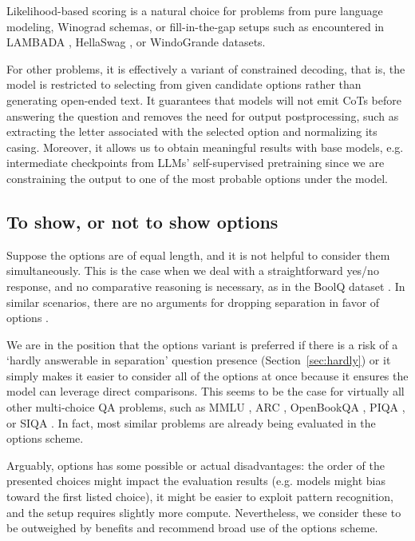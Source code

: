 \documentclass[11pt]{article}
\DeclareRobustCommand{\shl}[3]{
  \begingroup\setlength{\fboxsep}{2pt}%
  \colorbox{#1}{{\hspace*{2pt}\vphantom{Ay}#2\hspace*{2pt}}}%
  \endgroup
}
\begin{document}
Likelihood-based scoring is a natural choice for problems from pure language modeling, Winograd schemas, or fill-in-the-gap setups such as encountered in LAMBADA \cite{paperno2016lambadadatasetwordprediction}, HellaSwag \cite{DBLP:journals/corr/abs-1911-11641}, or WindoGrande \cite{sakaguchi2019winograndeadversarialwinogradschema} datasets.

For other problems, it is effectively a variant of constrained decoding, that is, the model is restricted to selecting from given candidate options rather than generating open-ended text. It guarantees that models will not emit CoTs before answering the question and removes the need for output postprocessing, such as extracting the letter associated with the selected option and normalizing its casing. Moreover, it allows us to obtain meaningful results with base models, e.g. intermediate checkpoints from LLMs' self-supervised pretraining since we are constraining the output to one of the most probable options under the model.

\subsection{To show, or not to show options}

Suppose the options are of equal length, and it is not helpful to consider them simultaneously. This is the case when we deal with a straightforward yes/no response, and no comparative reasoning is necessary, as in the BoolQ dataset \cite{clark2019boolqexploringsurprisingdifficulty}. In similar scenarios, there are no arguments for dropping \shl{separation}{separation}{} in favor of \shl{all}{options}{}.

We are in the position that the \shl{all}{options}{} variant is preferred if there is a risk of a `hardly answerable in separation' question presence (Section~\ref{sec:hardly}) or it simply makes it easier to consider all of the options at once because it ensures the model can leverage direct comparisons. This seems to be the case for virtually all other multi-choice QA problems, such as MMLU \cite{hendrycks2021measuringmassivemultitasklanguage}, ARC \cite{clark2018thinksolvedquestionanswering}, OpenBookQA \cite{mihaylov2018suitarmorconductelectricity}, PIQA \cite{DBLP:journals/corr/abs-1911-11641}, or SIQA \cite{sap2019socialiqacommonsensereasoningsocial}.
In fact, most similar problems are already being evaluated in the \shl{all}{options}{} scheme.

Arguably, \shl{all}{options}{} has some possible or actual disadvantages: the order of the presented choices might impact the evaluation results (e.g. models might bias toward the first listed choice), it might be easier to exploit pattern recognition, and the setup requires slightly more compute. Nevertheless, we consider these to be outweighed by benefits and recommend broad use of the \shl{all}{options}{} scheme.
\end{document}
